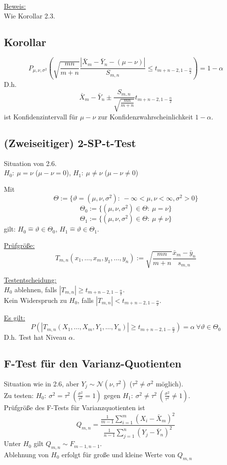 \documentclass[a4paper,11pt,twoside,titlepage]{article}
\newcommand\NN{ \mathcal{N} } %
\begin{document}
\underline{Beweis:}\\
Wie Korollar 2.3.

\subsection{Korollar}
\[P_{\mu,\nu,\sigma^2}\left(\sqrt{\frac{mn}{m+n}}\frac{|\bar X_m-\bar Y_n-(\mu-\nu)|}{S_{m,n}}\leq t_{m+n-2,1-\frac\alpha2}\right)=1-\alpha\]
D.h.
\[\bar X_m-\bar Y_n\pm\frac{S_{m,n}}{\sqrt{\frac{mn}{m+n}}}t_{m+n-2,1-\frac\alpha2}\]
ist Konfidenzintervall für $\mu-\nu$ zur Konfidenzwahrscheinlichkeit $1-\alpha$.

\subsection{(Zweiseitiger) 2-SP-t-Test}
Situation von 2.6.\\
$H_0:\ \mu=\nu$ ($\mu-\nu=0$), $H_1:\ \mu\neq\nu$ ($\mu-\nu\neq0$)

Mit
\[\Theta:=\{\vartheta=(\mu,\nu,\sigma^2):\ -\infty<\mu,\nu<\infty, \sigma^2>0\}\]
\[\Theta_0:=\{(\mu,\nu,\sigma^2)\in\Theta:\ \mu=\nu\}\]
\[\Theta_1:=\{(\mu,\nu,\sigma^2)\in\Theta:\ \mu\neq\nu\}\]
gilt: $H_0\hat{=}\vartheta\in\Theta_0$, $H_1\hat{=}\vartheta\in\Theta_1$.

\underline{Prüfgröße:}
\[T_{m,n}(x_1,\ldots,x_m,y_1,\ldots,y_n):=\sqrt{\frac{mn}{m+n}}\frac{\bar x_m-\bar y_n}{s_{m,n}}\]

\underline{Testentscheidung:}\\
$H_0$ ablehnen, falls $|T_{m,n}|\geq t_{m+n-2,1-\frac\alpha2}$.\\
Kein Widerspruch zu $H_0$, falls $|T_{m,n}|< t_{m+n-2,1-\frac\alpha2}$.

\underline{Es gilt:}
\[P(|T_{m,n}(X_1,\ldots,X_m,Y_1,\ldots,Y_n)|\geq t_{m+n-2,1-\frac\alpha2})=\alpha\ \forall\vartheta\in\Theta_0\]
D.h. Test hat Niveau $\alpha$.

\subsection{F-Test für den Varianz-Quotienten}
Situation wie in 2.6, aber $Y_j\sim\NN(\nu,\tau^2)$ ($\tau^2\neq\sigma^2$ möglich).\\
Zu testen: $H_0:\ \sigma^2=\tau^2\ (\frac{\sigma^2}{\tau^2}=1)$ gegen $H_1:\ \sigma^2\neq\tau^2\ (\frac{\sigma^2}{\tau^2}\neq1)$.\\
Prüfgröße des F-Tests für Varianzquotienten ist
\[Q_{m,n}=\frac{\frac{1}{m-1}\sum_{i=1}^m(X_i-\bar X_m)^2}{\frac{1}{n-1}\sum_{j=1}^n(Y_j-\bar Y_n)^2}\]
Unter $H_0$ gilt $Q_{m,n}\sim F_{m-1,n-1}$.\\
Ablehnung von $H_0$ erfolgt für große und kleine Werte von $Q_{m,n}$
\end{document}
